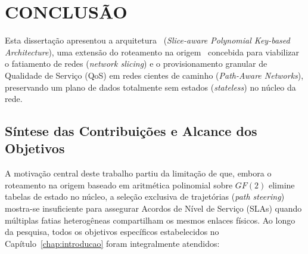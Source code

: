 \chapter{CONCLUSÃO}
\label{chap:conclusao}

Esta dissertação apresentou a arquitetura \nome\ (\textit{Slice-aware Polynomial Key-based Architecture}), uma extensão do roteamento na origem \polka\ concebida para viabilizar o fatiamento de redes (\textit{network slicing}) e o provisionamento granular de Qualidade de Serviço (QoS) em redes cientes de caminho (\textit{Path-Aware Networks}), preservando um plano de dados totalmente sem estados (\textit{stateless}) no núcleo da rede.

\section{Síntese das Contribuições e Alcance dos Objetivos}
\label{sec:sintese_contribuicoes}

A motivação central deste trabalho partiu da limitação de que, embora o roteamento na origem baseado em aritmética polinomial sobre $GF(2)$ elimine tabelas de estado no núcleo, a seleção exclusiva de trajetórias (\textit{path steering}) mostra-se insuficiente para assegurar Acordos de Nível de Serviço (SLAs) quando múltiplas fatias heterogêneas compartilham os mesmos enlaces físicos. Ao longo da pesquisa, todos os objetivos específicos estabelecidos no Capítulo~\ref{chap:introducao} foram integralmente atendidos:

